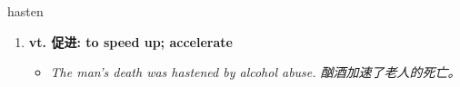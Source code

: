 
\begin{frame}
{\huge hasten}
\begin{center}
\begin{enumerate}\Large
  \item \textbf{vt. 促进: to speed up; accelerate}
  \begin{itemize}
    \item \em{\Large{The man’s death was hastened by alcohol abuse. 酗酒加速了老人的死亡。}}
  \end{itemize}
\end{enumerate}
\end{center}
\end{frame}
